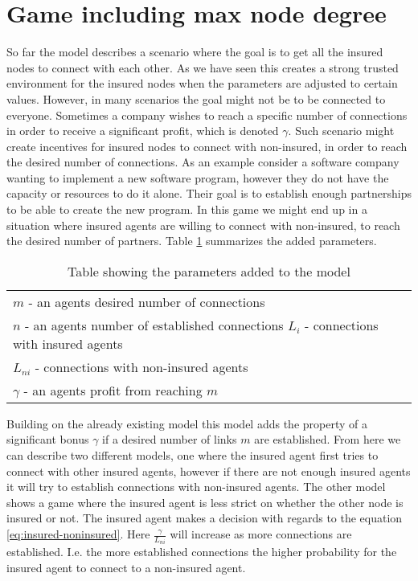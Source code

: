 
\section{Game including max node degree}
So far the model describes a scenario where the goal is to get all the insured nodes to connect with each other. As we have seen this creates a strong trusted environment for the insured nodes when the parameters are adjusted to certain values. However, in many scenarios the goal might not be to be connected to everyone. Sometimes a company wishes to reach a specific number of connections in order to receive a significant profit, which is denoted $\gamma$. Such scenario might create incentives for insured nodes to connect with non-insured, in order to reach the desired number of connections. As an example consider a software company wanting to implement a new software program, however they do not have the capacity or resources to do it alone. Their goal is to establish enough partnerships to be able to create the new program. In this game we might end up in a situation where insured agents are willing to connect with non-insured, to reach the desired number of partners. Table \ref{tbl:model3para} summarizes the added parameters. 

\begin{table}[h]
\centering
\begin{tabular}{lc}
 \hline
  $m$ - an agents desired number of connections\\
  $n$ - an agents number of established connections
  $L_{i}$ - connections with insured agents \\
  $L_{ni}$ - connections with non-insured agents\\
  $\gamma$ - an agents profit from reaching $m$ \\
  \hline
\end{tabular}
\caption{Table showing the parameters added to the model \label{tbl:model3para}}
\end{table}


Building on the already existing model this model adds the property of a significant bonus $\gamma$ if a desired number of links $m$ are established. From here we can describe two different models, one where the insured agent first tries to connect with other insured agents, however if there are not enough insured agents it will try to establish connections with non-insured agents. The other model shows a game where the insured agent is less strict on whether the other node is insured or not. The insured agent makes a decision with regards to the equation \ref{eq:insured-noninsured}. Here $\frac{\gamma}{ L_{ni}}$ will increase as more connections are established. I.e. the more established connections the higher probability for the insured agent to connect to a non-insured agent.

